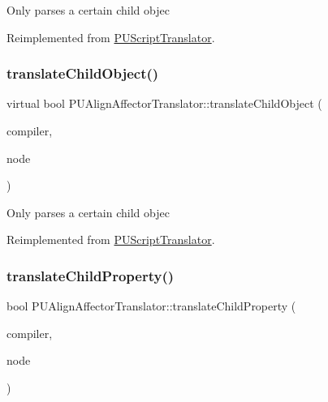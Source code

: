 Only parses a certain child objec 

Reimplemented from \hyperlink{classPUScriptTranslator_ab587d01348ae3e678cb700c719b2b113}{P\+U\+Script\+Translator}.

\mbox{\label{classPUAlignAffectorTranslator_ade62ab4eaeff6a9c9eea6b01437c8433}} 
\subsubsection{\texorpdfstring{translate\+Child\+Object()}{translateChildObject()}\hspace{0.1cm}{\footnotesize\ttfamily [2/2]}}
{\footnotesize\ttfamily virtual bool P\+U\+Align\+Affector\+Translator\+::translate\+Child\+Object (\begin{DoxyParamCaption}\item[{\hyperlink{classPUScriptCompiler}{P\+U\+Script\+Compiler} $\ast$}]{compiler,  }\item[{\hyperlink{classPUAbstractNode}{P\+U\+Abstract\+Node} $\ast$}]{node }\end{DoxyParamCaption})\hspace{0.3cm}{\ttfamily [virtual]}}

Only parses a certain child objec 

Reimplemented from \hyperlink{classPUScriptTranslator_ab587d01348ae3e678cb700c719b2b113}{P\+U\+Script\+Translator}.

\mbox{\label{classPUAlignAffectorTranslator_a5e64d895bfa3c7fb44fdece8f77946d7}} 
\subsubsection{\texorpdfstring{translate\+Child\+Property()}{translateChildProperty()}\hspace{0.1cm}{\footnotesize\ttfamily [1/2]}}
{\footnotesize\ttfamily bool P\+U\+Align\+Affector\+Translator\+::translate\+Child\+Property (\begin{DoxyParamCaption}\item[{\hyperlink{classPUScriptCompiler}{P\+U\+Script\+Compiler} $\ast$}]{compiler,  }\item[{\hyperlink{classPUAbstractNode}{P\+U\+Abstract\+Node} $\ast$}]{node }\end{DoxyParamCaption})\hspace{0.3cm}{\ttfamily [virtual]}}

